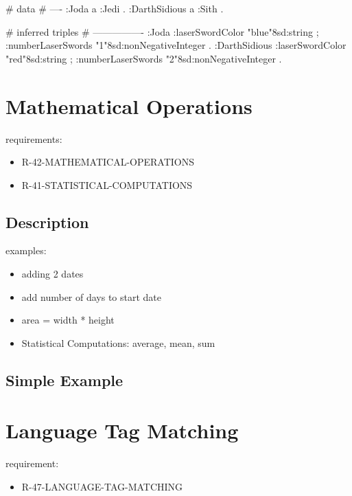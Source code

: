 \documentclass{llncs}
\begin{document}
\begin{ex}
# data
# ----
:Joda a :Jedi .
:DarthSidious a :Sith .
\end{ex}

\begin{ex}
# inferred triples
# ----------------
:Joda 
    :laserSwordColor "blue"^^xsd:string ;
    :numberLaserSwords "1"^^xsd:nonNegativeInteger .
:DarthSidious 
    :laserSwordColor "red"^^xsd:string ;
    :numberLaserSwords "2"^^xsd:nonNegativeInteger .
\end{ex}

\section{Mathematical Operations}

requirements:

\begin{itemize}
	\item R-42-MATHEMATICAL-OPERATIONS
	\item R-41-STATISTICAL-COMPUTATIONS
\end{itemize}

\subsection{Description}

examples:

\begin{itemize}
	\item adding 2 dates
	\item add number of days to start date
	\item area = width * height
	\item Statistical Computations: average, mean, sum
\end{itemize}

\subsection{Simple Example}

\section{Language Tag Matching}

requirement:

\begin{itemize}
	\item R-47-LANGUAGE-TAG-MATCHING
\end{itemize}
\end{document}
